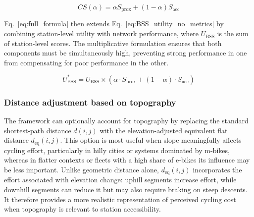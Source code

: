         \begin{equation}\label{eq:combined_score}
            CS(\alpha) = \alpha S_{\mathrm{prox}} + (1 - \alpha) S_{\mathrm{acc}}
        \end{equation}

        Eq.~\ref{eq:full_formula} then extends Eq.~\ref{eq:BSS_utility_no_metrics} by combining station-level utility with network performance, where $U_{\mathrm{BSS}}$ is the sum of station-level scores. The multiplicative formulation ensures that both components must be simultaneously high, preventing strong performance in one from compensating for poor performance in the other.

        \begin{equation} \label{eq:full_formula}
        U_{\mathrm{BSS}}^* = U_{\mathrm{BSS}} \times \left( \alpha \cdot S_{\mathrm{prox}} + (1 - \alpha) \cdot S_{\mathrm{acc}} \right)
        \end{equation}

    
        \subsubsection{Distance adjustment based on topography}\label{sec:slopes}

        The framework can optionally account for topography by replacing the standard shortest-path distance $d(i,j)$ with the elevation-adjusted equivalent flat distance $d_{\mathrm{eq}}(i,j)$. This option is most useful when slope meaningfully affects cycling effort, particularly in hilly cities or systems dominated by m-bikes, whereas in flatter contexts or fleets with a high share of e-bikes its influence may be less important. Unlike geometric distance alone, $d_{\mathrm{eq}}(i,j)$ incorporates the effort associated with elevation change: uphill segments increase effort, while downhill segments can reduce it but may also require braking on steep descents. It therefore provides a more realistic representation of perceived cycling cost when topography is relevant to station accessibility.

